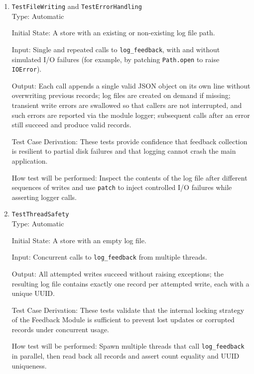 \documentclass[12pt, titlepage]{article}
\begin{document}
\begin{enumerate}
Test Case Derivation: These tests enforce the data schema used for offline analysis of user feedback and ensure that automatic source classification behaves as intended.

How test will be performed: Log feedback events, read back lines from the JSONL log, and assert field presence, formats, and classification logic.

\item{\texttt{TestFileWriting} and \texttt{TestErrorHandling}\\}
Type:  Automatic

Initial State: A store with an existing or non-existing log file path.

Input: Single and repeated calls to \texttt{log\_feedback}, with and without simulated I/O failures (for example, by patching \texttt{Path.open} to raise \texttt{IOError}).

Output: Each call appends a single valid JSON object on its own line without overwriting previous records; log files are created on demand if missing; transient write errors are swallowed so that callers are not interrupted, and such errors are reported via the module logger; subsequent calls after an error still succeed and produce valid records.

Test Case Derivation: These tests provide confidence that feedback collection is resilient to partial disk failures and that logging cannot crash the main application.

How test will be performed: Inspect the contents of the log file after different sequences of writes and use \texttt{patch} to inject controlled I/O failures while asserting logger calls.

\item{\texttt{TestThreadSafety}\\}
Type:  Automatic

Initial State: A store with an empty log file.

Input: Concurrent calls to \texttt{log\_feedback} from multiple threads.

Output: All attempted writes succeed without raising exceptions; the resulting log file contains exactly one record per attempted write, each with a unique UUID.

Test Case Derivation: These tests validate that the internal locking strategy of the Feedback Module is sufficient to prevent lost updates or corrupted records under concurrent usage.

How test will be performed: Spawn multiple threads that call \texttt{log\_feedback} in parallel, then read back all records and assert count equality and UUID uniqueness.
\end{enumerate}
\end{document}
